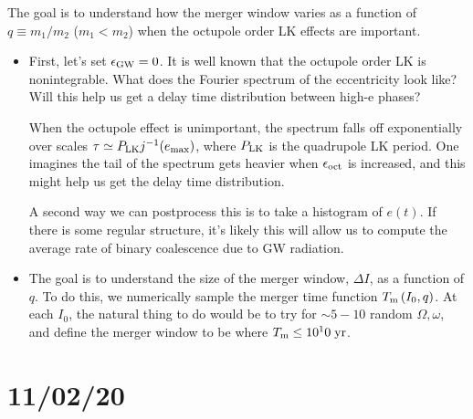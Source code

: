 \documentclass[10pt]{article}%
\newcommand*{\p}[1]{\left(#1\right)}
\begin{document}
The goal is to understand how the merger window varies as a function of $q
\equiv m_1 / m_2$ ($m_1 < m_2$) when the octupole order LK effects are
important.
\begin{itemize}
    \item First, let's set $\epsilon_{\rm GW} = 0$. It is well known that the
        octupole order LK is nonintegrable. What does the Fourier spectrum of
        the eccentricity look like? Will this help us get a delay time
        distribution between high-e phases?

        When the octupole effect is unimportant, the spectrum falls off
        exponentially over scales $\tau \simeq P_{\rm LK} j^{-1}(e_{\max})$,
        where $P_{\rm LK}$ is the quadrupole LK period. One imagines the
        tail of the spectrum gets heavier when $\epsilon_{\rm oct}$ is
        increased, and this might help us get the delay time distribution.

        A second way we can postprocess this is to take a histogram of $e(t)$.
        If there is some regular structure, it's likely this will allow us to
        compute the average rate of binary coalescence due to GW radiation.

    \item The goal is to understand the size of the merger window, $\Delta I$,
        as a function of $q$. To do this, we numerically sample the merger time
        function $T_{\rm m}\p{I_0, q}$. At each $I_0$, the natural thing to do
        would be to try for $\sim 5-10$ random $\Omega, \omega$, and define the
        merger window to be where $T_{\rm m} \leq 10^10\;\mathrm{yr}$.
\end{itemize}

\section{11/02/20}
\end{document}
